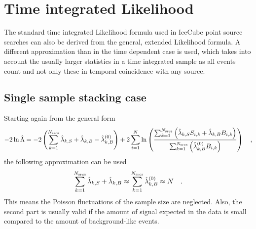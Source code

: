 \section{Time integrated Likelihood}
The standard time integrated Likelihood formula used in IceCube point source searches can also be derived from the general, extended Likelihood formula.
A different approximation than in the time dependent case is used, which takes into account the usually larger statistics in a time integrated sample as all events count and not only these in temporal coincidence with any source.

\subsection{Single sample stacking case}
Starting again from the general form
\begin{equation}
  -2\ln\hat{\Lambda}
  = -2\left(\sum_{k=1}^{N_\text{srcs}}\hat{\lambda}_{k,S} +
                                      \hat{\lambda}_{k,B} -
                                      \hat{\lambda}_{k,B}^{(0)}\right) +
    2\sum_{i=1}^N \ln\left(
      \frac{\sum_{k=1}^{N_\text{srcs}}\left(
          \hat{\lambda}_{k,S} S_{i,k}+\hat{\lambda}_{k,B} B_{i,k}\right)}
          {\sum_{k=1}^{N_\text{srcs}}\left(
            \hat{\lambda}_{k,B}^{(0)} B_{i,k}
          \right)}
        \right)
  \quad\text{,}
\end{equation}
the following approximation can be used
\begin{equation}
  \sum_{k=1}^{N_\text{srcs}} \hat{\lambda}_{k,S} + \hat{\lambda}_{k,B} \approx
    \sum_{k=1}^{N_\text{srcs}} \hat{\lambda}_{k,B}^{(0)} \approx N
  \quad\text{.}
\end{equation}
This means the Poisson fluctuations of the sample size are neglected.
Also, the second part is usually valid if the amount of signal expected in the data is small compared to the amount of background-like events.

